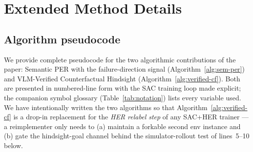 %

\section{Extended Method Details}
\label{app:methods}

\subsection{Algorithm pseudocode}
\label{app:algorithms}

We provide complete pseudocode for the two algorithmic contributions of
the paper: Semantic PER with the failure-direction signal
(Algorithm~\ref{alg:sem-per}) and VLM-Verified Counterfactual Hindsight
(Algorithm~\ref{alg:verified-cf}). Both are presented in
numbered-line form with the SAC training loop made explicit; the
companion symbol glossary (Table~\ref{tab:notation}) lists every variable
used. We have intentionally written the two algorithms so that
Algorithm~\ref{alg:verified-cf} is a drop-in replacement for the
\emph{HER relabel step} of any SAC+HER trainer --- a reimplementer only
needs to (a) maintain a forkable second env instance and (b) gate the
hindsight-goal channel behind the simulator-rollout test of
lines~5--10 below.

\setcounter{algctr}{0}

